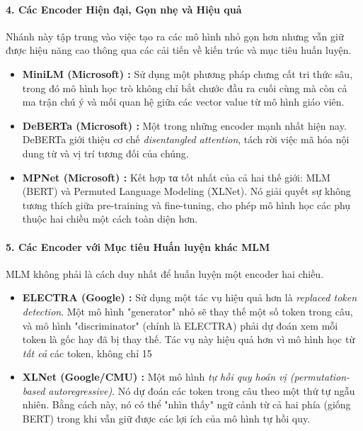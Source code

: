\paragraph{4. Các Encoder Hiện đại, Gọn nhẹ và Hiệu quả}
Nhánh này tập trung vào việc tạo ra các mô hình nhỏ gọn hơn nhưng vẫn giữ được hiệu năng cao thông qua các cải tiến về kiến trúc và mục tiêu huấn luyện.
\begin{itemize}
    \item \textbf{MiniLM (Microsoft) \cite{wang2020minilm}:} Sử dụng một phương pháp chưng cất tri thức sâu, trong đó mô hình học trò không chỉ bắt chước đầu ra cuối cùng mà còn cả ma trận chú ý và mối quan hệ giữa các vector value từ mô hình giáo viên.
    \item \textbf{DeBERTa (Microsoft) \cite{he2020deberta}:} Một trong những encoder mạnh nhất hiện nay. DeBERTa giới thiệu cơ chế \textit{disentangled attention}, tách rời việc mã hóa nội dung từ và vị trí tương đối của chúng.
    \item \textbf{MPNet (Microsoft) \cite{song2020mpnet}:} Kết hợp τα tốt nhất của cả hai thế giới: MLM (BERT) và Permuted Language Modeling (XLNet). Nó giải quyết sự không tương thích giữa pre-training và fine-tuning, cho phép mô hình học các phụ thuộc hai chiều một cách toàn diện hơn.
\end{itemize}

\paragraph{5. Các Encoder với Mục tiêu Huấn luyện khác MLM}
MLM không phải là cách duy nhất để huấn luyện một encoder hai chiều.
\begin{itemize}
    \item \textbf{ELECTRA (Google) \cite{clark2020electra}:} Sử dụng một tác vụ hiệu quả hơn là \textit{replaced token detection}. Một mô hình "generator" nhỏ sẽ thay thế một số token trong câu, và mô hình "discriminator" (chính là ELECTRA) phải dự đoán xem mỗi token là gốc hay đã bị thay thế. Tác vụ này hiệu quả hơn vì mô hình học từ \textit{tất cả} các token, không chỉ 15%
    \item \textbf{XLNet (Google/CMU) \cite{yang2019xlnet}:} Một mô hình \textit{tự hồi quy hoán vị (permutation-based autoregressive)}. Nó dự đoán các token trong câu theo một thứ tự ngẫu nhiên. Bằng cách này, nó có thể "nhìn thấy" ngữ cảnh từ cả hai phía (giống BERT) trong khi vẫn giữ được các lợi ích của mô hình tự hồi quy.
\end{itemize}

